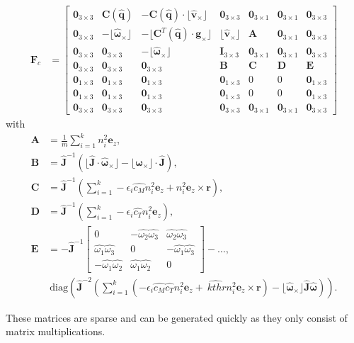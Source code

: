 \documentclass[10pt,a4paper]{article}
\newcommand{\skewsym}[1]{\lfloor #1 _\times \rfloor}
\newcommand{\angvel}{\boldsymbol{\omega}}
\newcommand{\kthr}{c_T}
\newcommand{\kmom}{c_M}
\newcommand{\Inertia}{\mathbf{J}}
\begin{document}
\begin{align}
\mathbf{F}_c &=  \begin{bmatrix}
\mathbf{0}_{3\times3} & \mathbf{C}(\hat{\mathbf{q}}) & -\mathbf{C}(\hat{\mathbf{q}}) \cdot \skewsym{\hat{\mathbf{v}}} & \mathbf{0}_{3\times3} & \mathbf{0}_{3\times1} & \mathbf{0}_{3\times1} & \mathbf{0}_{3\times3} \\
\mathbf{0}_{3\times3} & -\skewsym{\hat{\boldsymbol{\omega}}} & - \skewsym{\mathbf{C}^T(\hat{\mathbf{q}}) \cdot \mathbf{g} } & \skewsym{\hat{\mathbf{v}}} & \mathbf{A} & \mathbf{0}_{3\times1} & \mathbf{0}_{3\times3} \\
\mathbf{0}_{3\times3} & \mathbf{0}_{3\times3} & -\skewsym{\hat{\boldsymbol{\omega}}} & \mathbf{I}_{3\times3} & \mathbf{0}_{3\times1} & \mathbf{0}_{3\times1} & \mathbf{0}_{3\times3} \\
\mathbf{0}_{3\times3} & \mathbf{0}_{3\times3} & \mathbf{0}_{3\times3} & \mathbf{B} & \mathbf{C} & \mathbf{D} & \mathbf{E} \\
\mathbf{0}_{1\times3} & \mathbf{0}_{1\times3} & \mathbf{0}_{1\times3} & \mathbf{0}_{1\times3} & 0 & 0 & \mathbf{0}_{1\times3} \\
\mathbf{0}_{1\times3} & \mathbf{0}_{1\times3} & \mathbf{0}_{1\times3} & \mathbf{0}_{1\times3} & 0 & 0 & \mathbf{0}_{1\times3} \\
\mathbf{0}_{3\times3} & \mathbf{0}_{3\times3} & \mathbf{0}_{3\times3} & \mathbf{0}_{3\times3} & \mathbf{0}_{3\times1} & \mathbf{0}_{3\times1} & \mathbf{0}_{3\times3}
\end{bmatrix} 
\end{align}
with
\begin{align}
\mathbf{A} &= \frac{1}{m} \sum_{i=1}^k n_i^2 \mathbf{e}_z ,\\
\mathbf{B} &= \hat{\mathbf{J}}^{-1} \left( \skewsym{\hat{\Inertia} \cdot \hat{\angvel}} - \skewsym{\angvel} \cdot \hat{\Inertia} \right) ,\\
\mathbf{C} &= \hat{\Inertia}^{-1} \left( \sum_{i=1}^k -\epsilon_i \hat{\kmom} n_i^2 \mathbf{e}_z + n_i^2 \mathbf{e}_z \times \mathbf{r} \right) ,\\
\mathbf{D} &= \hat{\Inertia}^{-1} \left( \sum_{i=1}^k -\epsilon_i \hat{\kthr} n_i^2 \mathbf{e}_z  \right) ,\\
\mathbf{E} &= - \hat{\Inertia}^{-1} \begin{bmatrix}
0 & -\hat{\omega_2}\hat{\omega_3} & \hat{\omega_2}\hat{\omega_3} \\
\hat{\omega_1}\hat{\omega_3} & 0 & -\hat{\omega_1}\hat{\omega_3} \\
-\hat{\omega_1}\hat{\omega_2} & \hat{\omega_1}\hat{\omega_2} & 0
\end{bmatrix} - \ldots ,\\
&~ \mathrm{diag} \left( \hat{\Inertia}^{-2} \left( \sum_{i=1}^k \left( -\epsilon_i \hat{\kmom} \hat{\kthr} n_i^2 \mathbf{e}_z + \hat{\ kthr} n_i^2 \mathbf{e}_z \times \mathbf{r} \right) - \skewsym{\hat{\angvel}} \hat{\Inertia} \hat{\angvel} \right) \right). 
\end{align}

These matrices are sparse and can be generated quickly as they only consist of matrix multiplications.
\printbibliography
\end{document}
